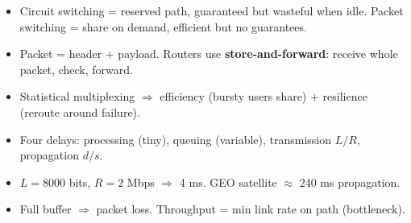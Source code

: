 \begin{recap}
\begin{itemize}
  \item Circuit switching = reserved path, guaranteed but wasteful when idle. Packet switching = share on demand, efficient but no guarantees.
  \item Packet = header + payload. Routers use \textbf{store-and-forward}: receive whole packet, check, forward.
  \item Statistical multiplexing $\Rightarrow$ efficiency (bursty users share) + resilience (reroute around failure).
  \item Four delays: processing (tiny), queuing (variable), transmission $L/R$, propagation $d/s$.
  \item $L=8000$ bits, $R=2$ Mbps $\Rightarrow$ 4 ms. GEO satellite $\approx$ 240 ms propagation.
  \item Full buffer $\Rightarrow$ packet loss. Throughput = min link rate on path (bottleneck).
\end{itemize}
\end{recap}
